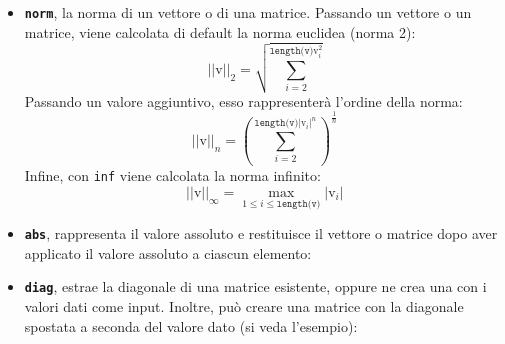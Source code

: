 \documentclass[a4paper]{article}
\begin{document}
\begin{itemize}
        \item \texttt{\textbf{norm}}, la norma di un vettore o di una matrice. Passando un vettore o un matrice, viene calcolata di default la norma euclidea (norma 2):
        \begin{equation*}
            \left|\left| \mathrm{v} \right|\right|_{2} = \sqrt{\sum_{i = 2}^{\texttt{length(v)} \mathrm{v}_{i}^{2}}}
        \end{equation*}
        Passando un valore aggiuntivo, esso rappresenterà l'ordine della norma:
        \begin{equation*}
            \left|\left| \mathrm{v} \right|\right|_{n} = \left( \sum_{i = 2}^{\texttt{length(v)} \left| \mathrm{v}_{i} \right|^{n}} \right)^{\frac{1}{n}}
        \end{equation*}
        Infine, con \texttt{inf} viene calcolata la norma infinito:
        \begin{equation*}
            \left|\left| \mathrm{v} \right|\right|_{\infty} = \underset{1 \le i \le \texttt{length(v)}}{\max} \left| \mathrm{v}_{i} \right|
        \end{equation*}
        

        \item \texttt{\textbf{abs}}, rappresenta il valore assoluto e restituisce il vettore o matrice dopo aver applicato il valore assoluto a ciascun elemento:
        

        \newpage

        \item \texttt{\textbf{diag}}, estrae la diagonale di una matrice esistente, oppure ne crea una con i valori dati come input. Inoltre, può creare una matrice con la diagonale spostata a seconda del valore dato (si veda l'esempio):
        
    \end{itemize}

    \newpage
\end{document}
